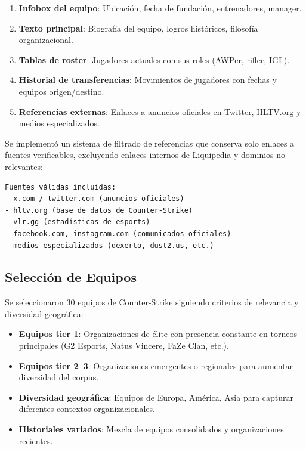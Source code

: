\begin{enumerate}
    \item \textbf{Infobox del equipo}: Ubicación, fecha de fundación, entrenadores, manager.
    \item \textbf{Texto principal}: Biografía del equipo, logros históricos, filosofía organizacional.
    \item \textbf{Tablas de roster}: Jugadores actuales con sus roles (AWPer, rifler, IGL).
    \item \textbf{Historial de transferencias}: Movimientos de jugadores con fechas y equipos origen/destino.
    \item \textbf{Referencias externas}: Enlaces a anuncios oficiales en Twitter, HLTV.org y medios especializados.
\end{enumerate}

Se implementó un sistema de filtrado de referencias que conserva solo enlaces a fuentes verificables, excluyendo enlaces internos de Liquipedia y dominios no relevantes:

\begin{verbatim}
Fuentes válidas incluidas:
- x.com / twitter.com (anuncios oficiales)
- hltv.org (base de datos de Counter-Strike)
- vlr.gg (estadísticas de esports)
- facebook.com, instagram.com (comunicados oficiales)
- medios especializados (dexerto, dust2.us, etc.)
\end{verbatim}

\subsection{Selección de Equipos}

Se seleccionaron 30 equipos de Counter-Strike siguiendo criterios de relevancia y diversidad geográfica:

\begin{itemize}
    \item \textbf{Equipos tier 1}: Organizaciones de élite con presencia constante en torneos principales (G2 Esports, Natus Vincere, FaZe Clan, etc.).
    
    \item \textbf{Equipos tier 2--3}: Organizaciones emergentes o regionales para aumentar diversidad del corpus.
    
    \item \textbf{Diversidad geográfica}: Equipos de Europa, América, Asia para capturar diferentes contextos organizacionales.
    
    \item \textbf{Historiales variados}: Mezcla de equipos consolidados y organizaciones recientes.
\end{itemize}

